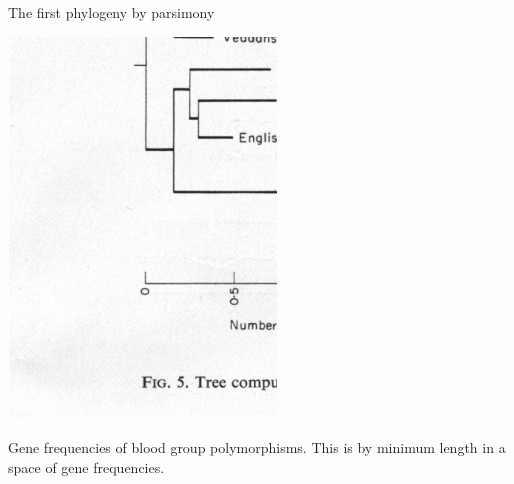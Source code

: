 \documentclass[bluish,slideColor,colorBG,pdf]{prosper}
\begin{document}
\begin{slide}[Replace]{The first phylogeny by parsimony}

\begin{center}
\includegraphics[width=2.8in]{edwardstree3.ps}
\end{center}

Gene frequencies of blood group polymorphisms.  This is by minimum length in a space of gene frequencies.

\end{slide}
\end{document}
